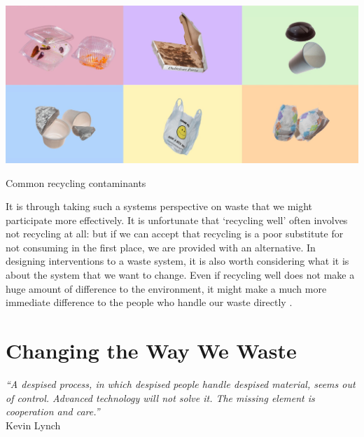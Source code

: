 \documentclass[nofonts,nols,justified,nobib]{tufte-book}
\begin{document}
\begin{marginfigure}
\includegraphics[width=\textwidth]{img/1/contaminants.jpg}
\caption{Common recycling contaminants \cite{albeck-ripka_6_2018}}
\end{marginfigure}


It is through taking such a systems perspective on waste that we might participate more effectively. It is unfortunate that `recycling well' often involves not recycling at all: but if we can accept that recycling is a poor substitute for not consuming in the first place, we are provided with an alternative. In designing interventions to a waste system, it is also worth considering what it is about the system that we want to change. Even if recycling well does not make a huge amount of difference to the environment, it might make a much more immediate difference to the people who handle our waste directly \cite{liboiron_against_2014}.

\newpage

\section*{Changing the Way We Waste}

\begin{flushright}
\emph{``A despised process, in which despised people handle despised material, seems out of control. Advanced technology will not solve it. The missing element is cooperation and care.''}\cite{lynch_wasting_1990}\\
Kevin Lynch
\end{flushright}

\end{document}
